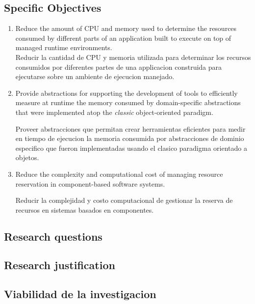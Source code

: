 \subsection{Specific Objectives}
\begin{enumerate}
\item Reduce the amount of CPU and memory used to determine the resources consumed by different parts of an application built to execute on top of managed runtime environments.\\
Reducir la cantidad de CPU y memoria utilizada para determinar los recursos consumidos por diferentes partes de una applicacion construida para ejecutarse 
sobre un ambiente de ejecucion manejado.\\

\item Provide abstractions for supporting the development of tools to efficiently measure at runtime the memory consumed by domain-specific abstractions that were implemented atop the \textit{classic} object-oriented paradigm.

Proveer abstracciones que permitan crear
herramientas eficientes para medir en tiempo de ejecucion la memoria consumida por abstracciones de dominio especifico que fueron implementadas usando el clasico paradigma orientado a objetos.\\

\item Reduce the complexity and computational cost of managing resource reservation in component-based software systems.

Reducir la complejidad y costo computacional de gestionar la reserva de recursos en sistemas basados en componentes.
\end{enumerate}

\subsection{Research questions}

\subsection{Research justification}

\subsection{Viabilidad de la investigacion}

